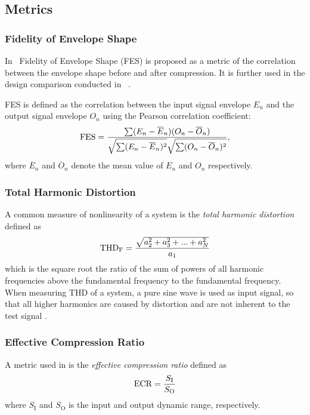 \documentclass[../main2.tex]{subfiles}
\begin{document}
\subsection{Metrics}\label{theory_metrics}

\subsubsection{Fidelity of Envelope Shape} \label{metric_fes}
In~\cite{stone2007quantifying} Fidelity of Envelope Shape (FES) is proposed as a metric of the correlation between the envelope shape before and after compression. It is further used in the design comparison conducted in ~\cite{reiss2012tutorial}.

FES is defined as the correlation between the input signal envelope $E_n$ and the output signal envelope $O_n$ using the Pearson correlation coefficient: \begin{equation}
\text{FES} = \dfrac{\sum(E_n - \overline{E}_n)(O_n - \overline{O}_n)}{\sqrt{\sum(E_n - \overline{E}_n )^2}\sqrt{\sum(O_n - \overline{O}_n )^2}},
\end{equation}
where $\overline{E}_n$ and $\overline{O}_n$ denote the mean value of $E_n$ and $O_n$ respectively.

\subsubsection{Total Harmonic Distortion}\label{metric_thd}
A common measure of nonlinearity of a system is the \emph{total harmonic distortion} defined as \cite{shmilovitz2005definition}
\begin{align}
\text{THD}_\text{F} = \dfrac{\sqrt{a_2^2 + a_3^2 + ... + a_N^2}}{a_1}
\end{align}
which is the square root the ratio of the sum of powers of all harmonic frequencies above the fundamental frequency to the fundamental frequency. When measuring THD of a system, a pure sine wave is used as input signal, so that all higher harmonics are caused by distortion and are not inherent to the test signal \cite{davis1989sound}.

\subsubsection{Effective Compression Ratio}\label{metric_ecr}
A metric used in \cite{stone1992syllabic} is the \emph{effective compression ratio} defined as
\begin{align}
\text{ECR} = \dfrac{S_\text{I}}{S_\text{O}}
\end{align}
where $S_\text{I}$ and $S_\text{O}$ is the input  and output dynamic range, respectively.
\end{document}
